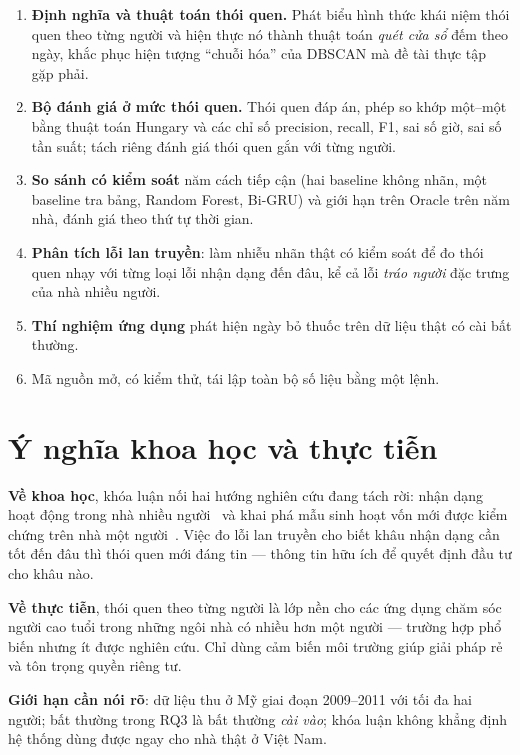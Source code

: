 \begin{enumerate}
  \item \textbf{Định nghĩa và thuật toán thói quen.} Phát biểu hình thức khái niệm thói quen theo
  từng người và hiện thực nó thành thuật toán \emph{quét cửa sổ} đếm theo ngày, khắc phục hiện
  tượng ``chuỗi hóa'' của DBSCAN mà đề tài thực tập gặp phải.
  \item \textbf{Bộ đánh giá ở mức thói quen.} Thói quen đáp án, phép so khớp một--một bằng thuật
  toán Hungary và các chỉ số precision, recall, F1, sai số giờ, sai số tần suất; tách riêng đánh
  giá thói quen gắn với từng người.
  \item \textbf{So sánh có kiểm soát} năm cách tiếp cận (hai baseline không nhãn, một baseline tra
  bảng, Random Forest, Bi-GRU) và giới hạn trên Oracle trên năm nhà, đánh giá theo thứ tự thời gian.
  \item \textbf{Phân tích lỗi lan truyền}: làm nhiễu nhãn thật có kiểm soát để đo thói quen nhạy
  với từng loại lỗi nhận dạng đến đâu, kể cả lỗi \emph{tráo người} đặc trưng của nhà nhiều người.
  \item \textbf{Thí nghiệm ứng dụng} phát hiện ngày bỏ thuốc trên dữ liệu thật có cài bất thường.
  \item Mã nguồn mở, có kiểm thử, tái lập toàn bộ số liệu bằng một lệnh.
\end{enumerate}

\section{Ý nghĩa khoa học và thực tiễn}

\textbf{Về khoa học}, khóa luận nối hai hướng nghiên cứu đang tách rời: nhận dạng hoạt động trong
nhà nhiều người~\cite{chen2021thesis,wang2021smrt,chen2026mdp} và khai phá mẫu sinh hoạt vốn mới
được kiểm chứng trên nhà một người~\cite{karpekov2025discover}. Việc đo lỗi lan truyền cho biết
khâu nhận dạng cần tốt đến đâu thì thói quen mới đáng tin --- thông tin hữu ích để quyết định đầu
tư cho khâu nào.

\textbf{Về thực tiễn}, thói quen theo từng người là lớp nền cho các ứng dụng chăm sóc người cao
tuổi trong những ngôi nhà có nhiều hơn một người --- trường hợp phổ biến nhưng ít được nghiên cứu.
Chỉ dùng cảm biến môi trường giúp giải pháp rẻ và tôn trọng quyền riêng tư.

\textbf{Giới hạn cần nói rõ}: dữ liệu thu ở Mỹ giai đoạn 2009--2011 với tối đa hai người; bất
thường trong RQ3 là bất thường \emph{cài vào}; khóa luận không khẳng định hệ thống dùng được ngay
cho nhà thật ở Việt Nam.

